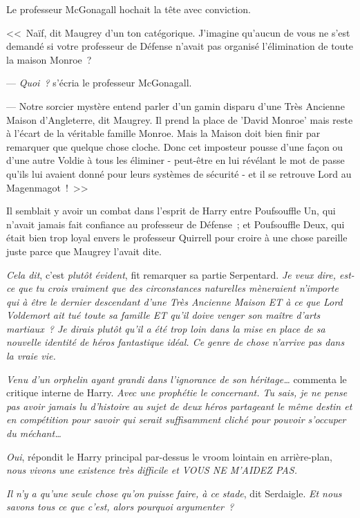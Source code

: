 Le professeur McGonagall hochait la tête avec conviction.

<<~Naïf, dit Maugrey d'un ton catégorique. J'imagine qu'aucun de vous ne s'est demandé si votre professeur de Défense n'avait pas organisé l'élimination de toute la maison Monroe~?

--- \emph{Quoi~?} s'écria le professeur McGonagall.

--- Notre sorcier mystère entend parler d'un gamin disparu d'une Très Ancienne Maison d'Angleterre, dit Maugrey. Il prend la place de 'David Monroe' mais reste à l'écart de la véritable famille Monroe. Mais la Maison doit bien finir par remarquer que quelque chose cloche. Donc cet imposteur pousse d'une façon ou d'une autre Voldie à tous les éliminer - peut-être en lui révélant le mot de passe qu'ils lui avaient donné pour leurs systèmes de sécurité - et il se retrouve Lord au Magenmagot~!~>>

Il semblait y avoir un combat dans l'esprit de Harry entre Poufsouffle Un, qui n'avait jamais fait confiance au professeur de Défense~; et Poufsouffle Deux, qui était bien trop loyal envers le professeur Quirrell pour croire à une chose pareille juste parce que Maugrey l'avait dite.

\emph{Cela dit}, c'est \emph{plutôt évident}, fit remarquer sa partie Serpentard. \emph{Je veux dire, est-ce que tu crois vraiment que des circonstances naturelles mèneraient n'importe qui à être le dernier descendant d'une Très Ancienne Maison ET à ce que Lord Voldemort ait tué toute sa famille ET qu'il doive venger son maître d'arts martiaux~? Je dirais plutôt qu'il a été trop loin dans la mise en place de sa nouvelle identité de héros fantastique idéal. Ce genre de chose n'arrive pas dans la vraie vie.}

\emph{Venu d'un orphelin ayant grandi dans l'ignorance de son héritage…} commenta le critique interne de Harry. \emph{Avec une prophétie le concernant. Tu sais, je ne pense pas avoir jamais lu d'histoire au sujet de deux héros partageant le même destin et en compétition pour savoir qui serait suffisamment cliché pour pouvoir s'occuper du méchant…}

\emph{Oui}, répondit le Harry principal par-dessus le vroom lointain en arrière-plan, \emph{nous vivons une existence très difficile et VOUS NE M'AIDEZ PAS.}

\emph{Il n'y a qu'une seule chose qu'on puisse faire, à ce stade}, dit Serdaigle. \emph{Et nous savons tous ce que c'est, alors pourquoi argumenter~?}

